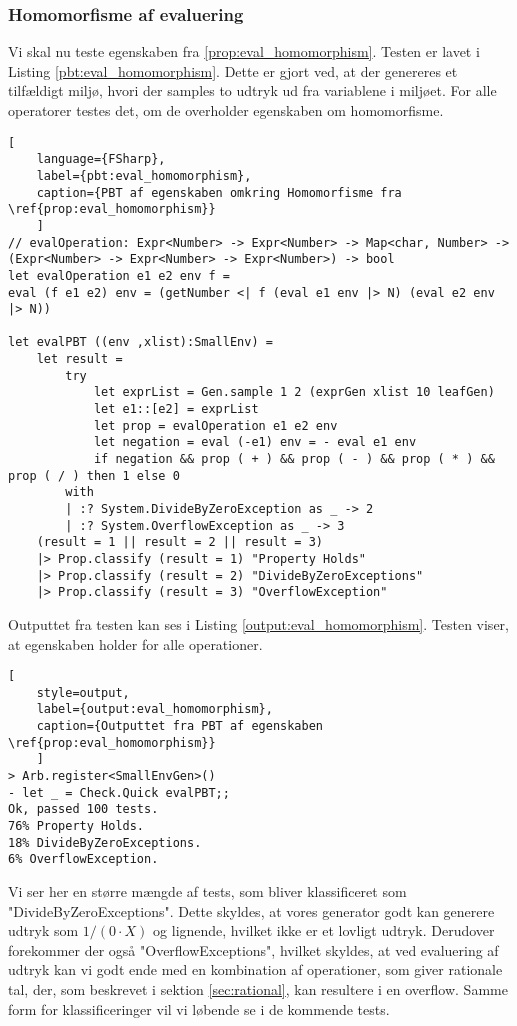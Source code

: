 \subsubsection{Homomorfisme af evaluering}\label{sec:PBT_eval_homomorphism}

Vi skal nu teste egenskaben fra \ref{prop:eval_homomorphism}. Testen er lavet i Listing \ref{pbt:eval_homomorphism}. Dette er gjort ved, at der genereres et tilfældigt miljø, hvori der samples to udtryk ud fra variablene i miljøet. For alle operatorer testes det, om de overholder egenskaben om homomorfisme.


\begin{lstlisting}[
    language={FSharp}, 
    label={pbt:eval_homomorphism}, 
    caption={PBT af egenskaben omkring Homomorfisme fra \ref{prop:eval_homomorphism}}
    ]
// evalOperation: Expr<Number> -> Expr<Number> -> Map<char, Number> -> (Expr<Number> -> Expr<Number> -> Expr<Number>) -> bool
let evalOperation e1 e2 env f =
eval (f e1 e2) env = (getNumber <| f (eval e1 env |> N) (eval e2 env |> N))
 
let evalPBT ((env ,xlist):SmallEnv) = 
    let result = 
        try
            let exprList = Gen.sample 1 2 (exprGen xlist 10 leafGen)
            let e1::[e2] = exprList
            let prop = evalOperation e1 e2 env
            let negation = eval (-e1) env = - eval e1 env
            if negation && prop ( + ) && prop ( - ) && prop ( * ) && prop ( / ) then 1 else 0
        with
        | :? System.DivideByZeroException as _ -> 2
        | :? System.OverflowException as _ -> 3
    (result = 1 || result = 2 || result = 3)
    |> Prop.classify (result = 1) "Property Holds"
    |> Prop.classify (result = 2) "DivideByZeroExceptions"
    |> Prop.classify (result = 3) "OverflowException"    
\end{lstlisting}

Outputtet fra testen kan ses i Listing \ref{output:eval_homomorphism}. Testen viser, at egenskaben holder for alle operationer.

\begin{lstlisting}[
    style=output, 
    label={output:eval_homomorphism}, 
    caption={Outputtet fra PBT af egenskaben \ref{prop:eval_homomorphism}}
    ]
> Arb.register<SmallEnvGen>()
- let _ = Check.Quick evalPBT;;
Ok, passed 100 tests.
76% Property Holds.
18% DivideByZeroExceptions.
6% OverflowException.
\end{lstlisting}
Vi ser her en større mængde af tests, som bliver klassificeret som "DivideByZeroExceptions". Dette skyldes, at vores generator godt kan generere udtryk som \(1/(0 \cdot X)\) og lignende, hvilket ikke er et lovligt udtryk. Derudover forekommer der også "OverflowExceptions", hvilket skyldes, at ved evaluering af udtryk kan vi godt ende med en kombination af operationer, som giver rationale tal, der, som beskrevet i sektion \ref{sec:rational}, kan resultere i en overflow. Samme form for klassificeringer vil vi løbende se i de kommende tests.



